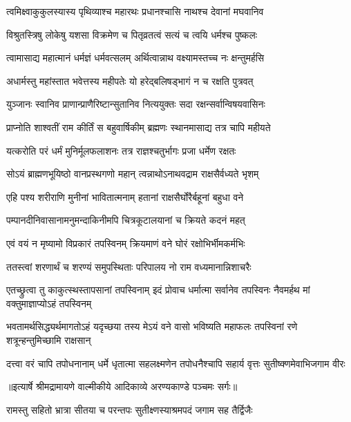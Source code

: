 \twolineshloka
{त्वमिक्ष्वाकुकुलस्यास्य पृथिव्याश्च महारथः}
{प्रधानश्चासि नाथश्च देवानां मघवानिव} %

\twolineshloka
{विश्रुतस्त्रिषु लोकेषु यशसा विक्रमेण च}
{पितृव्रतत्वं सत्यं च त्वयि धर्मश्च पुष्कलः} %

\twolineshloka
{त्वामासाद्य महात्मानं धर्मज्ञं धर्मवत्सलम्}
{अर्थित्वान्नाथ वक्ष्यामस्तच्च नः क्षन्तुमर्हसि} %

\twolineshloka
{अधार्मस्तु महांस्तात भवेत्तस्य महीपतेः}
{यो हरेद्बलिषड्भागं न च रक्षति पुत्रवत्} %

\twolineshloka
{युञ्जानः स्वानिव प्राणान्प्राणैरिष्टान्सुतानिव}
{नित्ययुक्तः सदा रक्षन्सर्वान्विषयवासिनः} %

\twolineshloka
{प्राप्नोति शाश्वतीं राम कीर्तिं स बहुवार्षिकीम्}
{ब्रह्मणः स्थानमासाद्य तत्र चापि महीयते} %

\twolineshloka
{यत्करोति परं धर्मं मुनिर्मूलफलाशनः}
{तत्र राज्ञश्चतुर्भागः प्रजा धर्मेण रक्षतः} %

\twolineshloka
{सोऽयं ब्राह्मणभूयिष्ठो वानप्रस्थगणो महान्}
{त्वन्नाथोऽनाथवद्राम राक्षसैर्वध्यते भृशम्} %

\twolineshloka
{एहि पश्य शरीराणि मुनीनां भावितात्मनाम्}
{हतानां राक्षसैर्घोरैर्बहूनां बहुधा वने} %

\twolineshloka
{पम्पानदीनिवासानामनुमन्दाकिनीमपि}
{चित्रकूटालयानां च क्रियते कदनं महत्} %

\twolineshloka
{एवं वयं न मृष्यामो विप्रकारं तपस्विनम्}
{क्रियमाणं वने घोरं रक्षोभिर्भीमकर्मभिः} %

\twolineshloka
{ततस्त्वां शरणार्थं च शरण्यं समुपस्थिताः}
{परिपालय नो राम वध्यमानान्निशाचरैः} %

\threelineshloka
{एतच्छ्रुत्वा तु काकुत्स्थस्तापसानां तपस्विनाम्}
{इदं प्रोवाच धर्मात्मा सर्वानेव तपस्विनः}
{नैवमर्हथ मां वक्तुमाज्ञाप्योऽहं तपस्विनम्} %

\threelineshloka
{भवतामर्थसिद्ध्यर्थमागतोऽहं यदृच्छया}
{तस्य मेऽयं वने वासो भविष्यति महाफलः}
{तपस्विनां रणे शत्रून्हन्तुमिच्छामि राक्षसान्} %

\fourlineindentedshloka
{दत्त्वा वरं चापि तपोधनानाम्}
{धर्मे धृतात्मा सहलक्ष्मणेन}
{तपोधनैश्चापि सहार्य वृत्तः}
{सुतीष्क्णमेवाभिजगाम वीरः} %


{॥इत्यार्षे श्रीमद्रामायणे वाल्मीकीये आदिकाव्ये अरण्यकाण्डे पञ्चमः सर्गः॥}


\twolineshloka
{रामस्तु सहितो भ्रात्रा सीतया च परन्तपः}
{सुतीक्ष्णस्याश्रमपदं जगाम सह तैर्द्विजैः} %

